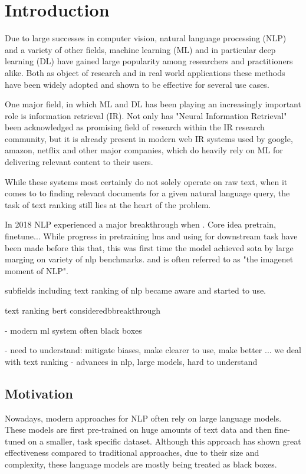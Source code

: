 \chapter{Introduction}
Due to large successes in computer vision, natural language processing (NLP) and a variety of other fields, machine learning (ML) and in particular deep learning (DL) have gained large popularity among researchers and practitioners alike. Both as object of research and in real world applications these methods have been widely adopted and shown to be effective for several use cases.

One major field, in which ML and DL has been playing an increasingly important role is information retrieval (IR). Not only has "Neural Information Retrieval" \cite{mitra2018an} been acknowledged as promising field of research within the IR research community, but it is already present in modern web IR systems used by google, amazon, netflix and other major companies, which do heavily rely on ML for delivering relevant content to their users.

While these systems most certainly do not solely operate on raw text, when it comes to to finding relevant documents for a given natural language query, the task of text ranking still lies at the heart of the problem.

In 2018 NLP experienced a major breakthrough when \cite{devlin-etal-2019-bert}. Core idea pretrain, finetune...
While progress in pretraining lms and using for downstream task have been made before this that, this was first time the model achieved sota by large marging on variety of nlp benchmarks. and is often referred to as "the imagenet moment of NLP".

subfields including text ranking of nlp became aware and started to use.


text ranking
bert consideredbbreakthrough

- modern ml system often black boxes

- need to understand: mitigate biases, make clearer to use, make better
... we deal with text ranking
- advances in nlp, large models, hard to understand

\section{Motivation}
Nowadays, modern approaches for NLP often rely on large language models. These models are first pre-trained on huge amounts of text data and then fine-tuned on a smaller, task specific dataset. Although this approach has shown great effectiveness compared to traditional approaches, due to their size and complexity, these language models are mostly being treated as black boxes.

